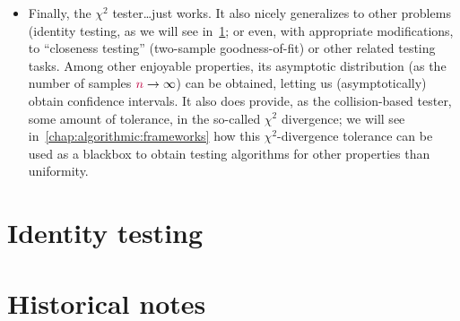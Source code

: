 \begin{itemize}
  \item Finally, the $\chi^2$ tester\dots just works. It also nicely generalizes to other problems (identity testing, as we will see in~\cref{sec:identity}; or even, with appropriate modifications, to ``closeness testing'' (two-sample goodness-of-fit) or other related testing tasks. Among other enjoyable properties, its asymptotic distribution (as the number of samples ${\textcolor{purple}{n}}\to\infty$) can be obtained, letting us (asymptotically) obtain confidence intervals. It also does provide, as the collision-based tester, some amount of tolerance, in the so-called $\chi^2$ divergence; we will see in~\cref{chap:algorithmic:frameworks} how this $\chi^2$-divergence tolerance can be used as a blackbox to obtain testing algorithms for other properties than uniformity.
\end{itemize}

\section{Identity testing}
  \label{sec:identity}
\tbc
\section{Historical notes}
\cite{Ingster86}
\cite{GoldreichR00}
\cite{BatuFRSW00}
\cite{Paninski08}
\cite{ChanDVV14}
\cite{AcharyaDK15}
\cite{DiakonikolasGPP18}
\cite{BlaisCG17}
\cite{HuangM13}
\cite{AcharyaCT19b,AcharyaCHST20,AminJM20}

\tbc

